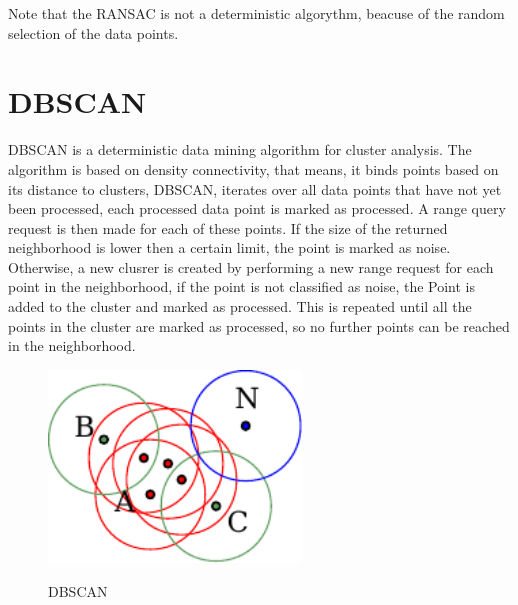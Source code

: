 Note that the \ac{RANSAC} is not a deterministic algorythm, beacuse of the random selection of the data points.

\section{\acl{DBSCAN}}

\ac {DBSCAN} \cite{DBSCAN} is a deterministic data mining algorithm for cluster analysis. The algorithm is based on density connectivity,
that means, it binds points based on its distance to clusters, \ac {DBSCAN}, iterates over all data points that have not yet been processed, 
each processed data point is marked as processed. A range query request is then made for each of these points. If the size of the returned neighborhood is lower then a certain limit,
the point is marked as noise. Otherwise, a new clusrer is created by performing a new range request for each point in the neighborhood, if the point is not classified as noise,
the Point is added to the cluster and marked as processed. This is repeated until all the points in the cluster are marked as processed, so no further points can be reached in the neighborhood.

\begin{figure}[!ht]
\begin{center}
\caption{\acs{DBSCAN} \cite{DBSCAN}}
\includegraphics[width=0.6\textwidth]{bilder/dbscan.pdf}
\label{dbscan}
\end{center}
\end{figure}



